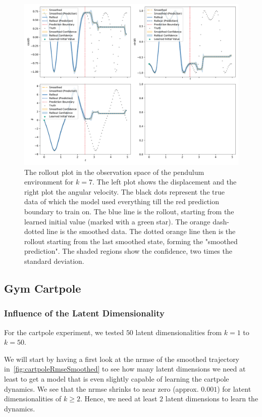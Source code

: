 			\begin{figure}
				\centering
				\includegraphics[width=\linewidth]{figures/results/pendulum-gym/run-latent-dim-07/rollout-observations-N0.pdf}
				\caption{The rollout plot in the observation space of the pendulum environment for \(k = 7\). The left plot shows the displacement and the right plot the angular velocity. The black dots represent the true data of which the model used everything till the red prediction boundary to train on. The blue line is the rollout, starting from the learned initial value (marked with a green star). The orange dash-dotted line is the smoothed data. The dotted orange line then is the rollout starting from the last smoothed state, forming the "smoothed prediction". The shaded regions show the confidence, \ie two times the standard deviation.}
				\label{fig:gymPendulumRolloutL7}
			\end{figure}

	\subsection{Gym Cartpole} %
		\subsubsection{Influence of the Latent Dimensionality}
			\label{subsubsec:cartpoleLatents}

			For the cartpole experiment, we tested \(50\) latent dimensionalities from \( k = 1 \) to \( k = 50 \).

			We will start by having a first look at the \ac{nrmse} of the smoothed trajectory in~\autoref{fig:cartpoleRmseSmoothed} to see how many latent dimensions we need at least to get a model that is even slightly capable of learning the cartpole dynamics. We see that the \ac{nrmse} shrinks to near zero (approx. \(0.001\)) for latent dimensionalities of \( k \geq 2 \). Hence, we need at least \(2\) latent dimensions to learn the dynamics.


